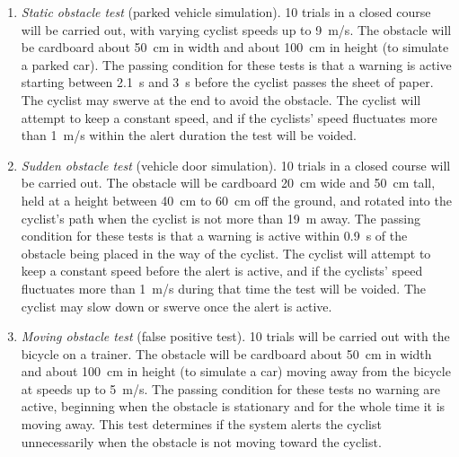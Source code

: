 \documentclass[journal]{IEEEtran}
\begin{document}
\begin{enumerate}
    \item \textit{Static obstacle test} (parked vehicle simulation). 10 trials in a closed course will be carried out, with varying cyclist speeds up to \SI{9}{\meter/\s}. The obstacle will be cardboard about \SI{50}{\cm} in width and about \SI{100}{\cm} in height (to simulate a parked car). The passing condition for these tests is that a warning is active starting between \SI{2.1}{\s} and \SI{3}{\s} before the cyclist passes the sheet of paper. The cyclist may swerve at the end to avoid the obstacle. The cyclist will attempt to keep a constant speed, and if the cyclists' speed fluctuates more than \SI{1}{\meter/\s} within the alert duration the test will be voided.
    
    \item \textit{Sudden obstacle test} (vehicle door simulation). 10 trials in a closed course will be carried out. The obstacle will be cardboard \SI{20}{\cm} wide and \SI{50}{\cm} tall, held at a height between \SI{40}{\cm} to \SI{60}{\cm} off the ground, and rotated into the cyclist's path when the cyclist is not more than \SI{19}{\meter} away. The passing condition for these tests is that a warning is active within \SI{0.9}{\s} of the obstacle being placed in the way of the cyclist. The cyclist will attempt to keep a constant speed before the alert is active, and if the cyclists' speed fluctuates more than \SI{1}{\meter/\s} during that time the test will be voided. The cyclist may slow down or swerve once the alert is active.
    
    \item \textit{Moving obstacle test} (false positive test). 10 trials will be carried out with the bicycle on a trainer. The obstacle will be cardboard about \SI{50}{\cm} in width and about \SI{100}{\cm} in height (to simulate a car) moving away from the bicycle at speeds up to \SI{5}{\meter/\s}. The passing condition for these tests no warning are active, beginning when the obstacle is stationary and for the whole time it is moving away. This test determines if the system alerts the cyclist unnecessarily when the obstacle is not moving toward the cyclist.
\end{enumerate}
\end{document}
